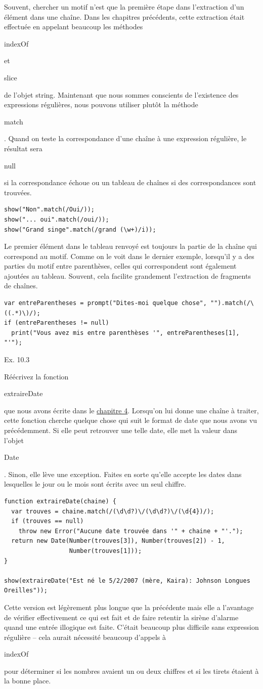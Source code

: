 \documentclass{FramateX}
\renewcommand{\texttt}[1]{\begin{sffamily}{#1}\end{sffamily}}
\begin{document}
Souvent, chercher un motif n'est que la première étape dans l'extraction
d'un élément dans une chaîne. Dans les chapitres précédents, cette
extraction était effectuée en appelant beaucoup les méthodes
\texttt{indexOf} et \texttt{slice} de l'objet string. Maintenant que
nous sommes conscients de l'existence des expressions régulières, nous
pouvons utiliser plutôt la méthode \texttt{match}. Quand on teste la
correspondance d'une chaîne à une expression régulière, le résultat sera
\texttt{null} si la correspondance échoue ou un tableau de chaînes si
des correspondances sont trouvées.

\begin{lstlisting}
show("Non".match(/Oui/));
show("... oui".match(/oui/));
show("Grand singe".match(/grand (\w+)/i));
\end{lstlisting}
Le premier élément dans le tableau renvoyé est toujours la partie de la
chaîne qui correspond au motif. Comme on le voit dans le dernier
exemple, lorsqu'il y a des parties du motif entre parenthèses, celles
qui correspondent sont également ajoutées au tableau. Souvent, cela
facilite grandement l'extraction de fragments de chaînes.

\begin{lstlisting}
var entreParentheses = prompt("Dites-moi quelque chose", "").match(/\((.*)\)/);
if (entreParentheses != null)
  print("Vous avez mis entre parenthèses '", entreParentheses[1], "'");
\end{lstlisting}
\begin{center}\end{center}

Ex. 10.3

Réécrivez la fonction \texttt{extraireDate} que nous avons écrite dans
le \href{chapter4.html}{chapitre 4}. Lorsqu'on lui donne une chaîne à
traiter, cette fonction cherche quelque chose qui suit le format de date
que nous avons vu précédemment. Si elle peut retrouver une telle date,
elle met la valeur dans l'objet \texttt{Date}. Sinon, elle lève une
exception. Faites en sorte qu'elle accepte les dates dans lesquelles le
jour ou le mois sont écrits avec un seul chiffre.

\begin{lstlisting}
function extraireDate(chaine) {
  var trouves = chaine.match(/(\d\d?)\/(\d\d?)\/(\d{4})/);
  if (trouves == null)
    throw new Error("Aucune date trouvée dans '" + chaine + "'.");
  return new Date(Number(trouves[3]), Number(trouves[2]) - 1,
                  Number(trouves[1]));
}

show(extraireDate("Est né le 5/2/2007 (mère, Kaira): Johnson Longues Oreilles"));
\end{lstlisting}
Cette version est légèrement plus longue que la précédente mais elle a
l'avantage de vérifier effectivement ce qui est fait et de faire
retentir la sirène d'alarme quand une entrée illogique est faite.
C'était beaucoup plus difficile sans expression régulière -- cela aurait
nécessité beaucoup d'appels à \texttt{indexOf} pour déterminer si les
nombres avaient un ou deux chiffres et si les tirets étaient à la bonne
place.
\end{document}
